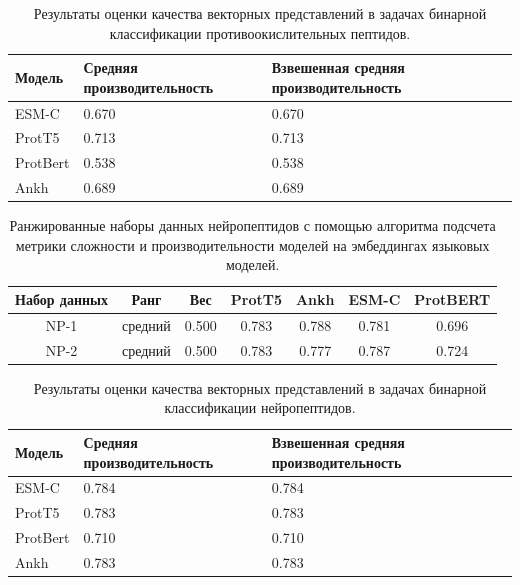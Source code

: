\documentclass[specification,annotation,times]{itmo-student-thesis}
\begin{document}
\begin{table}[h]
\centering

\caption{Результаты оценки качества векторных представлений в задачах бинарной классификации противоокислительных пептидов.}
\label{tab:compare_results_ao}
\begin{tabular}{|p{3cm}|p{5cm}|p{5cm}|}
\hline
Модель & Средняя \newline производительность & Взвешенная \newline средняя \newline производительность \\
\hline
ESM-C & 0.670 & 0.670 \\ \hline
ProtT5 & 0.713 & 0.713 \\ \hline
ProtBert & 0.538 & 0.538 \\ \hline
Ankh & 0.689 & 0.689 \\ \hline

\end{tabular}

\end{table}

\begin{table}[h]
\centering
\caption{Ранжированные наборы данных нейропептидов с помощью алгоритма подсчета метрики сложности и производительности моделей на эмбеддингах языковых моделей.}
\label{tab:model_performance_np}

\begin{tabular}{|c|c|c|c|c|c|c|}
\hline
Набор данных & Ранг & Вес & ProtT5 & Ankh & ESM-C & ProtBERT \\
\hline
NP-1 & средний & 0.500 & 0.783 & 0.788 & 0.781 & 0.696 \\ \hline
NP-2 & средний & 0.500 & 0.783 & 0.777 & 0.787 & 0.724 \\ \hline

\end{tabular}

\end{table}


\begin{table}[h]
\centering

\caption{Результаты оценки качества векторных представлений в задачах бинарной классификации нейропептидов.}
\label{tab:compare_results_np}
\begin{tabular}{|p{3cm}|p{5cm}|p{5cm}|}
\hline
Модель & Средняя \newline производительность & Взвешенная \newline средняя \newline производительность \\
\hline
ESM-C & 0.784 & 0.784 \\ \hline
ProtT5 & 0.783 & 0.783 \\ \hline
ProtBert & 0.710 & 0.710 \\ \hline
Ankh & 0.783 & 0.783 \\ \hline

\end{tabular}

\end{table}
\end{document}
